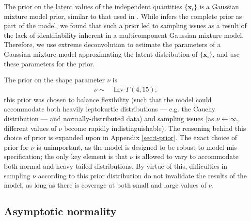 \documentclass[fleqn,usenatbib]{rasti}
\newcommand{\indepvars}{\boldsymbol{x}_i}
\begin{document}
The prior on the latent values of the independent quantities $\{\indepvars\}$ is
a Gaussian mixture model prior, similar to that used in \citet{Kelly:2007}.
While \citeauthor{Kelly:2007} infers the complete prior as part of the model, we
found that such a prior led to sampling issues as a result of the lack of
identifiability inherent in a multicomponent Gaussian mixture model. Therefore,
we use extreme deconvolution \citep{Bovy:2011} to estimate the parameters of a
Gaussian mixture model approximating the latent distribution of
$\{\indepvars\}$, and use these parameters for the prior.

The prior on the shape parameter $\nu$ is
\begin{align}
    \nu \sim&\; \text{Inv-}\Gamma(4, 15);
\end{align}
this prior was chosen to balance flexibility (such that the model could
accommodate both heavily leptokurtic distributions --- e.g. the Cauchy
distribution --- and normally-distributed data) and sampling issues (as $\nu
\leftarrow \infty$, different values of $\nu$ become rapidly indistinguishable).
The reasoning behind this choice of prior is expanded upon in Appendix
\ref{sec:t-prior}. The exact choice of prior for $\nu$ is unimportant, as the
model is designed to be robust to model mis-specification; the only key element
is that $\nu$ is allowed to vary to accommodate both normal and heavy-tailed
distributions. By virtue of this, difficulties in sampling $\nu$ according to
this prior distribution do not invalidate the results of the model, as long as
there is coverage at both small and large values of $\nu$.

\subsection{Asymptotic normality}
\label{sec:formalism.asymptotic}
\end{document}
